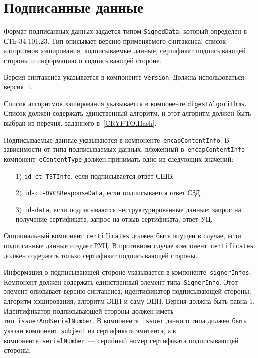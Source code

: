 \section{Подписанные данные}\label{FMT.SignedData}

Формат подписанных данных задается типом \texttt{SignedData}, 
который определен в СТБ 34.101.23. Тип описывает версию применяемого 
синтаксиса, список алгоритмов хэширования, подписываемые данные, 
сертификат подписывающей стороны и информацию о подписывающей стороне. 

Версия синтаксиса указывается в компоненте \texttt{version}.
Должна использоваться версия~$1$.

Список алгоритмов хэширования указывается в компоненте
\texttt{digestAlgorithms}. Список должен содержать единственный алгоритм,
и этот алгоритм должен быть выбран из перечня, 
заданного в~\ref{CRYPTO.Hash}.

Подписываемые данные указываются в компоненте~\texttt{encapContentInfo}. 
%
В зависимости от типа подписываемых данных, вложенный 
в~\texttt{encapContentInfo} компонент~\texttt{eContentType} 
должен принимать одно из следующих значений:
\begin{enumerate}
\item[1)]
\texttt{id-ct-TSTInfo}, если подписывается ответ СШВ;
\item[2)]
\texttt{id-ct-DVCSResponseData}, если подписывается ответ СЗД. 
\item[3)]
\texttt{id-data}, если подписываются неструктурированные данные:
запрос на получение сертификата, запрос на отзыв сертификата, ответ УЦ.
\end{enumerate}



Опциональный компонент~\texttt{certificates} должен быть опущен в случае, 
если подписанные данные создает РУЦ. В противном случае 
компонент~\texttt{certificates} должен содержать только сертификат 
подписывающей стороны.

Информация о подписывающей стороне указывается в
компоненте~\texttt{signerInfos}. Компонент должен содержать единственный
элемент типа~\texttt{SignerInfo}. Этот элемент описывает версию синтаксиса,
идентификатор подписывающей стороны, алгоритм хэширования, алгоритм ЭЦП и
саму ЭЦП. Версия должна быть равна $1$. Идентификатор подписывающей стороны
должен иметь тип~\texttt{issuerAndSerialNumber}. В 
компоненте~\texttt{issuer} данного типа должен быть указан 
компонент~\texttt{subject} из сертификата эмитента, а в  
компоненте~\texttt{serialNumber}~--- серийный номер сертификата 
подписывающей стороны. 

